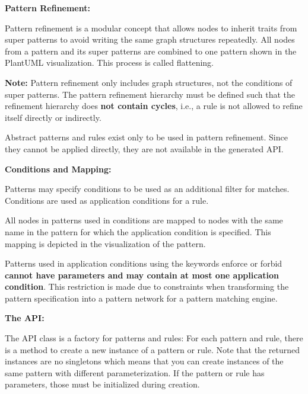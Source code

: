 \clearpage

\textbf{Pattern Refinement:}\newline

Pattern refinement is a modular concept that allows nodes to inherit traits from super patterns to avoid writing the same graph structures repeatedly. All nodes from a pattern and its super patterns are combined to one pattern shown in the PlantUML visualization. This process is called flattening.

\textbf{Note:} Pattern refinement only includes graph structures, not the conditions of super patterns. The pattern refinement hierarchy must be defined such that the refinement hierarchy does \textbf{not contain cycles}, i.e., a rule is not allowed to refine itself directly or indirectly.

Abstract patterns and rules exist only to be used in pattern refinement. Since they cannot be applied directly, they are not available in the generated API.\newline

\textbf{Conditions and Mapping:}\newline

Patterns may specify conditions to be used as an additional filter for matches. Conditions are used as application conditions for a rule.

All nodes in patterns used in conditions are mapped to nodes with the same name in the pattern for which the application condition is specified. This mapping is depicted in the visualization of the pattern.\newline

Patterns used in application conditions using the keywords enforce or forbid \textbf{cannot have parameters and may contain at most one application condition}. This restriction is made due to constraints when transforming the pattern specification into a pattern network for a pattern matching engine.\newline

\textbf{The API:}\newline

The API class is a factory for patterns and rules: For each pattern and rule, there is a method to create a new instance of a pattern or rule. Note that the returned instances are no singletons which means that you can create instances of the same pattern with different parameterization. If the pattern or rule has parameters, those must be initialized during creation.\newline

